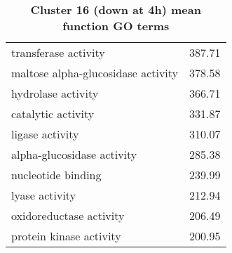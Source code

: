 \begin{table}[hp]
\begin{center}
\begin{tabular}{p{}r}
transferase activity                                             & 387.71                      \\
maltose alpha-glucosidase activity                               & 378.58                      \\
hydrolase activity                                               & 366.71                      \\
catalytic activity                                               & 331.87                      \\
ligase activity                                                  & 310.07                      \\
alpha-glucosidase activity                                       & 285.38                      \\
nucleotide binding                                               & 239.99                      \\
lyase activity                                                   & 212.94                      \\
oxidoreductase activity                                          & 206.49                      \\
protein kinase activity                                          & 200.95                      \\ \bottomrule                   
\end{tabular}
\end{center}

\caption[Cluster 16 (down at 4h) mean function GO terms]{\sf \textbf{Cluster 16 (down at 4h) mean function GO terms}}
\label{tab:cls16-function}
\end{table}